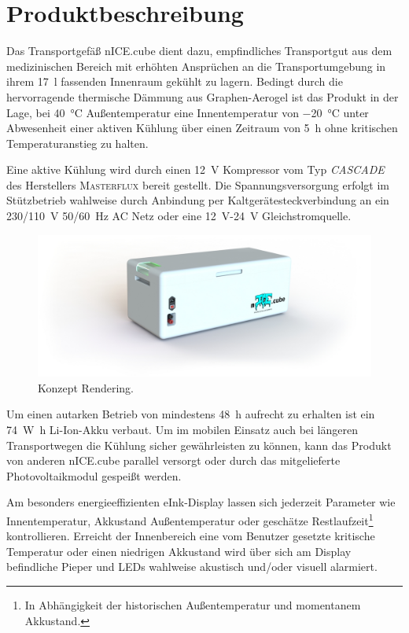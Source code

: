 \chapter{Produktbeschreibung}
	Das Transportgefäß \frq nICE.cube\flq{} dient dazu, empfindliches Transportgut aus dem medizinischen Bereich mit erhöhten Ansprüchen an die Transportumgebung
	in ihrem \SI{17}{\litre} fassenden Innenraum gekühlt zu lagern. Bedingt durch die hervorragende thermische Dämmung aus Graphen-Aerogel ist das Produkt
	in der Lage, bei \SI{40}{\celsius} Außentemperatur eine Innentemperatur von \SI{-20}{\celsius} unter Abwesenheit einer aktiven Kühlung über einen Zeitraum
	von \SI{5}{\hour} ohne kritischen Temperaturanstieg zu halten.\par\smallskip

	Eine aktive Kühlung wird durch einen \SI{12}{\volt} Kompressor vom Typ \textit{CASCADE} des Herstellers \textsc{Masterflux} bereit gestellt. Die Spannungsversorgung
	erfolgt im Stützbetrieb wahlweise durch Anbindung per Kaltgerätesteckverbindung an ein \SI{230/110}{\volt} \SI{50/60}{\hertz} AC Netz oder eine \SI{12}{\volt}-\SI{24}{\volt} Gleichstromquelle.\par\smallskip

	\begin{figure}[h]
		\centering
		\includegraphics[width=\textwidth]{assets/iso_edit.jpg}
		\caption[Konzept Rendering]{Konzept Rendering.}
		\label{fig:box side render}
	\end{figure}
	Um einen autarken Betrieb von mindestens \SI{48}{\hour} aufrecht zu erhalten ist ein \SI{74}{\watt\hour} Li-Ion-Akku verbaut. Um im mobilen Einsatz auch bei längeren
	Transportwegen die Kühlung sicher gewährleisten zu können, kann das Produkt von anderen \frq nICE.cube\flq{} parallel versorgt oder durch das mitgelieferte Photovoltaikmodul gespeißt werden.\par\smallskip

	Am besonders energieeffizienten eInk-Display lassen sich jederzeit Parameter wie Innentemperatur, Akkustand Außentemperatur oder geschätze Restlaufzeit\footnote{In Abhängigkeit der
	historischen Außentemperatur und momentanem Akkustand.} kontrollieren. Erreicht der Innenbereich eine vom Benutzer gesetzte kritische Temperatur oder einen niedrigen Akkustand
	wird über sich am Display befindliche Pieper und LEDs wahlweise akustisch und/oder visuell alarmiert.\par\smallskip

